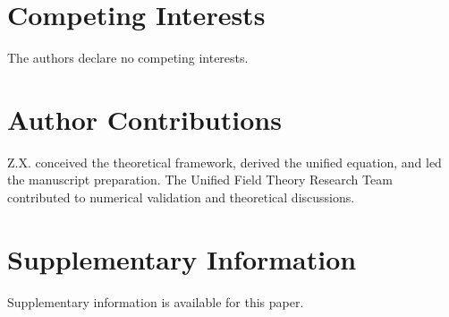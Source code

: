 \documentclass[12pt]{article}
\numberwithin{equation}{section}
\begin{document}
\section*{Competing Interests}
\label{sec:competing_interests}

The authors declare no competing interests.

\section*{Author Contributions}
\label{sec:author_contributions}

Z.X. conceived the theoretical framework, derived the unified equation, and led the manuscript preparation. The Unified Field Theory Research Team contributed to numerical validation and theoretical discussions.

\section*{Supplementary Information}
\label{sec:supplementary}

Supplementary information is available for this paper.



\end{document}
